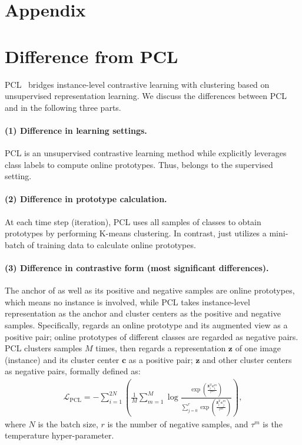 \renewcommand{\thetable}{A\arabic{table}}
\renewcommand{\thefigure}{A\arabic{figure}}
\renewcommand{\theequation}{A\arabic{equation}}
\setcounter{figure}{0}
\setcounter{table}{0}  
\setcounter{equation}{0}  

\appendix
\section*{Appendix}
\section{Difference from PCL}
\label{appendix:PCL}
PCL~\cite{PCL} bridges instance-level contrastive learning with clustering based on unsupervised representation learning. We discuss the differences between PCL and \methodname in the following three parts.

\paragraph{(1) Difference in learning settings.}
PCL is an unsupervised contrastive learning method while \methodname explicitly leverages class labels to compute online prototypes. Thus, \methodname belongs to the supervised setting.

\paragraph{(2) Difference in prototype calculation.}
At each time step (iteration), PCL uses all samples of classes to obtain prototypes by performing K-means clustering.
In contrast, \methodname just utilizes a mini-batch of training data to calculate online prototypes.

\paragraph{(3) Difference in contrastive form (most significant differences).}
The anchor of \methodname as well as its positive and negative samples are online prototypes, which means no instance is involved, while PCL takes instance-level representation as the anchor and cluster centers as the positive and negative samples. 
Specifically,
\methodname regards an online prototype and its augmented view as a positive pair; online prototypes of different classes are regarded as negative pairs. 
PCL clusters samples $M$ times, then regards a representation $\mathbf{z}$ of one image (instance) and its cluster center $\mathbf{c}$ as a positive pair; $\mathbf{z}$ and other cluster centers as negative pairs, formally defined as:
\begin{align}
\label{eq:PCL_infoNCE}
    \mathcal{L}_{\mathrm{PCL}}
    \!=-\sum_{i=1}^{2N}\left( \!\frac{1}{M} \sum_{m=1}^M\!\log\! 
    \frac
    {\exp (\frac{\mathbf{z}_i^\mathrm{T} \mathbf{c}_i^m}{\tau^m})}
    {\sum_{j=0}^{r} 
    \exp (\frac{\mathbf{z}_i^\mathrm{T} \mathbf{c}_j^m}{\tau^m})}\right),
\end{align}
where $N$ is the batch size, $r$ is the number of negative samples, and $\tau^m$ is the temperature hyper-parameter.

